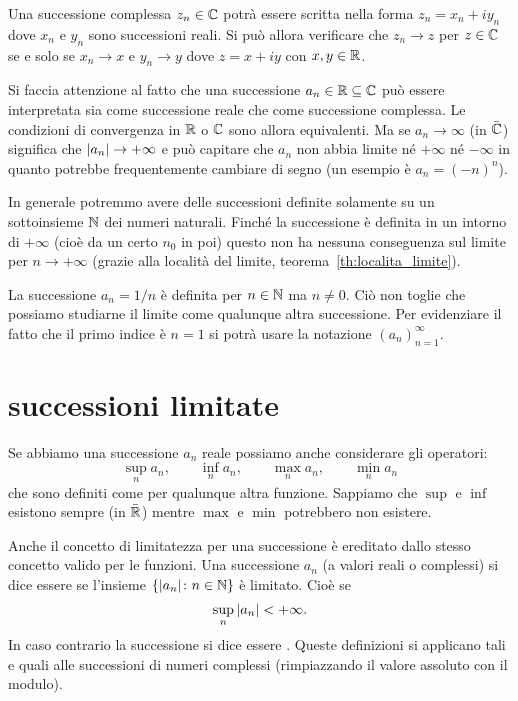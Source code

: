 \begin{exercise}
Una successione complessa $z_n\in \mathbb C$ potrà essere scritta
nella forma $z_n = x_n + i y_n$ dove $x_n$ e $y_n$ sono successioni
reali. Si può allora verificare che $z_n\to z$ per $z\in \mathbb C$ se e solo se
$x_n\to x$ e $y_n\to y$ dove $z=x+ iy$ con $x,y\in \mathbb R$.
\end{exercise}

Si faccia attenzione al fatto che una successione $a_n\in \mathbb R \subseteq \mathbb C$
può essere interpretata sia come successione reale che come successione complessa.
Le condizioni di convergenza in $\mathbb R$ o $\mathbb C$ sono allora equivalenti. Ma
se $a_n \to \infty$ (in $\bar {\mathbb C}$) significa che ${\left|a_n\right|}\to +\infty$
e può capitare che $a_n$ non abbia limite né $+\infty$
né $-\infty$ in quanto potrebbe frequentemente cambiare di segno
(un esempio è $a_n = (-n)^n$).

In generale potremmo avere delle successioni definite solamente 
su un sottoinsieme $\mathbb N$ dei numeri naturali. 
Finché la successione è definita in un intorno di $+\infty$ (cioè 
da un certo $n_0$ in poi) questo non ha nessuna conseguenza sul 
limite per $n\to +\infty$ (grazie alla località del limite, 
teorema~\ref{th:localita_limite}).

\begin{example}
  La successione $a_n = 1/n$ è definita per $n\in \mathbb N$ ma $n\neq 0$.
  Ciò non toglie che possiamo studiarne il limite come qualunque altra
  successione. Per evidenziare il fatto che il primo indice è $n=1$
  si potrà usare la notazione $(a_n)_{n=1}^\infty$.
\end{example}
 
\section{successioni limitate}

Se abbiamo una successione $a_n$ reale possiamo anche considerare gli operatori:
\[
  \sup_n a_n, \qquad 
  \inf_n a_n, \qquad 
  \max_n a_n, \qquad 
  \min_n a_n 
\]
che sono definiti come per qualunque altra funzione. 
Sappiamo che $\sup$ e $\inf$ esistono sempre (in $\bar{\mathbb R}$) mentre $\max$ e $\min$
potrebbero non esistere.

Anche il concetto di limitatezza per una successione è ereditato dallo stesso 
concetto valido per le funzioni.
Una successione $a_n$ (a valori reali o complessi) si dice essere 
 se 
l'insieme $\{{\left|a_n\right|}\colon n \in \mathbb N\}$ è limitato. Cioè se 
\[
\sup_n {\left|a_n\right|} < +\infty.  
\]
In caso contrario la successione si dice essere .
Queste definizioni si applicano tali e quali alle successioni di numeri 
complessi (rimpiazzando il valore assoluto con il modulo).

